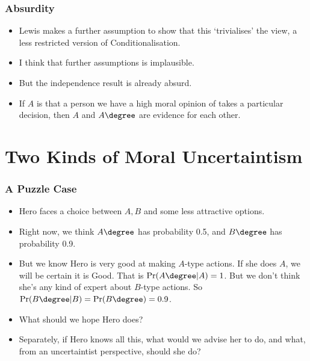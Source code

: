 \begin{frame}[fragile]
\frametitle{Absurdity}
\label{absurdity}

\begin{itemize}
\item{} Lewis makes a further assumption to show that this `trivialises' the view, a less restricted version of Conditionalisation.

\item{} I think that further assumptions is implausible.

\item{} But the independence result is already absurd.

\item{} If $A$ is that a person we have a high moral opinion of takes a particular decision, then $A$ and $A\degree$ are evidence for each other.

\end{itemize}

\end{frame}

\section{Two Kinds of Moral Uncertaintism}
\label{twokindsofmoraluncertaintism}

\begin{frame}[fragile]
\frametitle{A Puzzle Case}
\label{apuzzlecase}

\begin{itemize}
\item{} Hero faces a choice between $A, B$ and some less attractive options.

\item{} Right now, we think $A\degree$ has probability 0.5, and $B\degree$ has probability 0.9.

\item{} But we know Hero is very good at making $A$-type actions. If she does $A$, we will be certain it is Good. That is $\Pr(A\degree | A) = 1$. But we don't think she's any kind of expert about $B$-type actions. So $\Pr(B\degree | B) = \Pr(B\degree) = 0.9$.

\item{} What should we hope Hero does?

\item{} Separately, if Hero knows all this, what would we advise her to do, and what, from an uncertaintist perspective, should she do?

\end{itemize}

\end{frame}

